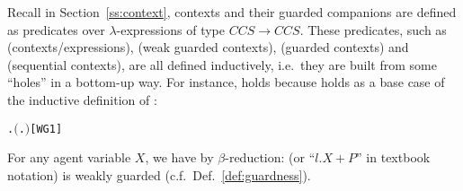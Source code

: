 Recall in Section~\ref{ss:context}, \univariate contexts and their
guarded companions are defined as predicates over $\lambda$-expressions
of type $CCS\rightarrow CCS$. These predicates, such as
(contexts/expressions),  (weak guarded contexts),
 (guarded contexts) and  (sequential
contexts), are all defined inductively, i.e.~they are built from some ``holes''
in a bottom-up way. For instance, 
holds because 
holds as a base case of the inductive definition of :
\begin{alltt}
\HOLTokenTurnstile{} \HOLSymConst{\HOLTokenForall{}}.  \ensuremath{(}\HOLTokenLambda{}. \HOLSymConst{\ensuremath{\ldotp}}\ensuremath{)}\hfill{[WG1]}
\end{alltt}
For any agent variable $X$, we have by $\beta$-reduction:
 (or ``$l.X + P$'' in textbook
notation) is weakly guarded (c.f.~Def.~\ref{def:guardness}).

